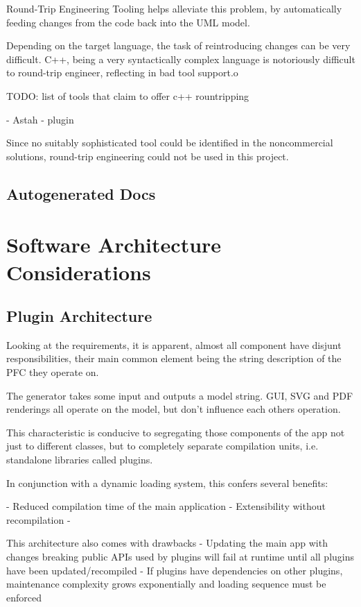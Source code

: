 Round-Trip Engineering Tooling helps alleviate this problem, by automatically feeding changes from the code back into the UML model.

Depending on the target language, the task of reintroducing changes can be very difficult. C++, being a very syntactically complex language is notoriously difficult to round-trip engineer, reflecting in bad tool support.o

TODO: list of tools that claim to offer c++ rountripping

- Astah - plugin


Since no suitably sophisticated tool could be identified in the noncommercial solutions, round-trip engineering could not be used in this project.


\subsection{Autogenerated Docs}


\section{Software Architecture Considerations}

\subsection{Plugin Architecture}
Looking at the requirements, it is apparent, almost all component have disjunt responsibilities, their main common element being the string description of the PFC they operate on.

The  generator takes some input and outputs a model string. GUI, SVG and PDF renderings all operate on the model, but don't influence each others operation.

This characteristic is conducive to segregating those components of the app not just to different classes, but to completely separate compilation units, i.e. standalone libraries called plugins.

In conjunction with a dynamic loading system, this confers several benefits:

- Reduced compilation time of the main application
- Extensibility without recompilation
- 

This architecture also comes with drawbacks
- Updating the main app with changes breaking public APIs used by plugins will fail at runtime until all plugins have been updated/recompiled
- If plugins have dependencies on other plugins, maintenance complexity grows exponentially and loading sequence must be enforced

